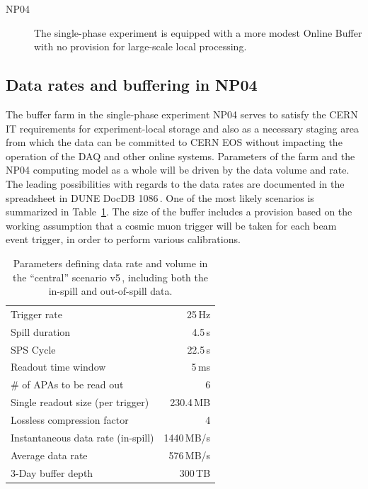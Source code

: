 \documentclass[12pt]{article}
\begin{document}
{\begin{description}
\item[ NP04] The single-phase experiment is equipped with a more modest Online Buffer with no provision for large-scale
local processing.
\end{description}

\noindent

\subsection{Data rates and buffering in NP04}
\label{sec:np04_data_rate}
The buffer farm in the single-phase experiment NP04 serves to satisfy
the CERN IT requirements for experiment-local storage and also as a necessary
staging area from which the data can be committed to CERN EOS without impacting the operation
of the DAQ and other online systems. Parameters of the farm and the NP04 computing model
as a whole will be driven by the data volume and rate. The leading possibilities with regards to the
data rates are documented in the spreadsheet in DUNE DocDB 1086\,\cite{duneDocDb1086}.
One of the most likely scenarios is summarized in Table~\ref{tab:np04_data_rate}. The size of
the buffer includes a provision based on the working assumption that a cosmic muon trigger will
be taken for each beam event trigger, in order to perform various calibrations.

\begin{table}[htbp]
  \centering
  \begin{tabular}[h]{l|r}
\hline
    Trigger rate & 25\,Hz \\
    Spill duration & 4.5\,s\\
    SPS Cycle & 22.5\,s \\
    Readout time window & 5\,ms \\
    \# of APAs to be read out & 6 \\
    \hline
    Single readout size (per trigger) & 230.4\,MB \\
    Lossless compression factor & 4 \\
    Instantaneous data rate (in-spill) & 1440\,MB/s \\
    Average data rate & 576\,MB/s \\
    \hline
    3-Day buffer depth & 300\,TB \\
    \hline
  \end{tabular}
  \caption{Parameters defining data rate and volume in the ``central'' scenario v5\,\cite{duneDocDb1086}, including both
  the in-spill and out-of-spill data.}
  \label{tab:np04_data_rate}
\end{table}

}
\end{document}
